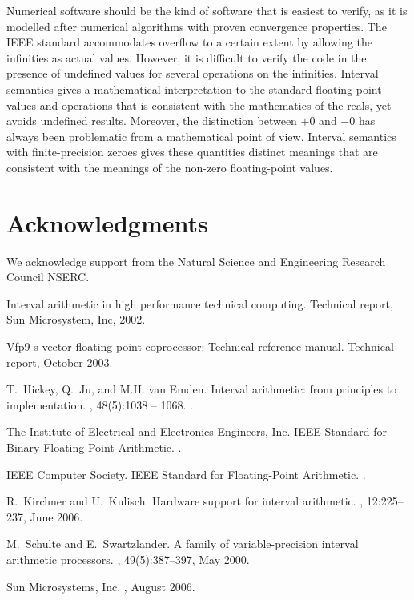 \documentclass[11pt]{article}
\begin{document}
Numerical software should be the kind of software that is easiest to
verify, as it is modelled after numerical algorithms with proven
convergence properties. The IEEE standard accommodates overflow to a
certain extent by allowing the infinities as actual values. However,
it is difficult to verify the code in the presence of undefined values
for several operations on the infinities. Interval semantics gives a
mathematical interpretation to the standard floating-point values and
operations that is consistent with the mathematics of the reals, yet
avoids undefined results. Moreover, the distinction between $+0$ and
$-0$ has always been problematic from a mathematical point of
view. Interval semantics with finite-precision zeroes gives these
quantities distinct meanings that are consistent with the meanings of
the non-zero floating-point values.

\section{Acknowledgments}
We acknowledge support from the Natural Science and
Engineering Research Council NSERC.




\begin{thebibliography}{1}

Interval arithmetic in high performance technical computing.
\newblock Technical report, Sun Microsystem, Inc, 2002.

Vfp9-s vector floating-point coprocessor: Technical reference manual.
\newblock Technical report, October 2003.

T.~Hickey, Q.~Ju, and M.H. van Emden.
\newblock Interval arithmetic: from principles to implementation.
, 48(5):1038 -- 1068.
.

The Institute of Electrical and Electronics Engineers, Inc.
\newblock IEEE Standard for Binary Floating-Point Arithmetic.
.

IEEE Computer Society.
\newblock IEEE Standard for Floating-Point Arithmetic.
.

R.~Kirchner and U.~Kulisch.
\newblock Hardware support for interval arithmetic.
, 12:225--237, June 2006.

M.~Schulte and E.~Swartzlander.
\newblock A family of variable-precision interval arithmetic processors.
, 49(5):387--397, May 2000.

Sun Microsystems, Inc.
, August 2006.

\end{thebibliography}
\end{document}
